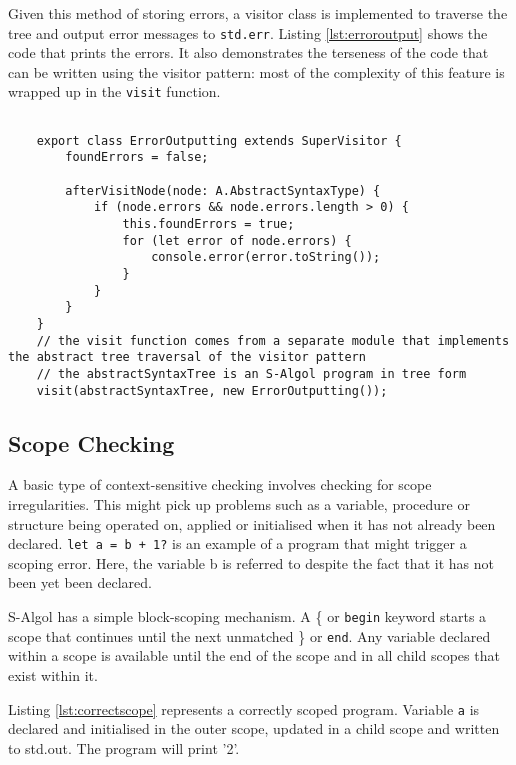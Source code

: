 \documentclass{article}
\begin{document}
Given this method of storing errors, a visitor class is implemented to traverse the tree and output error messages to \lstinline{std.err}. Listing \ref{lst:erroroutput} shows the code that prints the errors. It also demonstrates the terseness of the code that can be written using the visitor pattern: most of the complexity of this feature is wrapped up in the \lstinline{visit} function.

\begin{lstlisting}[caption=Error outputting visitor, label=lst:erroroutput]

    export class ErrorOutputting extends SuperVisitor {
        foundErrors = false;
    
        afterVisitNode(node: A.AbstractSyntaxType) {
            if (node.errors && node.errors.length > 0) {
                this.foundErrors = true;
                for (let error of node.errors) {
                    console.error(error.toString());
                }
            }
        }
    }
    // the visit function comes from a separate module that implements the abstract tree traversal of the visitor pattern
    // the abstractSyntaxTree is an S-Algol program in tree form
    visit(abstractSyntaxTree, new ErrorOutputting());
\end{lstlisting}

\subsection{Scope Checking}

A basic type of context-sensitive checking involves checking for scope irregularities. This might pick up problems such as a variable, procedure or structure being operated on, applied or initialised when it has not already been declared. \lstinline{let a = b + 1?} is an example of a program that might trigger a scoping error. Here, the variable b is referred to despite the fact that it has not been yet been declared. 

S-Algol has a simple block-scoping mechanism. A \{ or \lstinline{begin} keyword starts a scope that continues until the next unmatched \} or \lstinline{end}. Any variable declared within a scope is available until the end of the scope and in all child scopes that exist within it.

Listing \ref{lst:correctscope} represents a correctly scoped program. Variable \lstinline{a} is declared and initialised in the outer scope, updated in a child scope and written to std.out. The program will print '2'.
\end{document}
